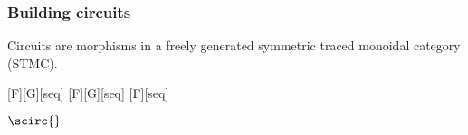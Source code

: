 \begin{frame}
    \frametitle{Building circuits}

    \centering
    \LARGE
    Circuits are morphisms in a
    \alert{freely generated symmetric traced monoidal category} (STMC).

    \wait
    [F][G][seq]
    \wait
    \quad
    [F][G][seq]
    \wait
    \quad
    [F][seq]

    \wait

    \vspace{1em}

    \Huge
    \(\scirc{}\)
\end{frame}
